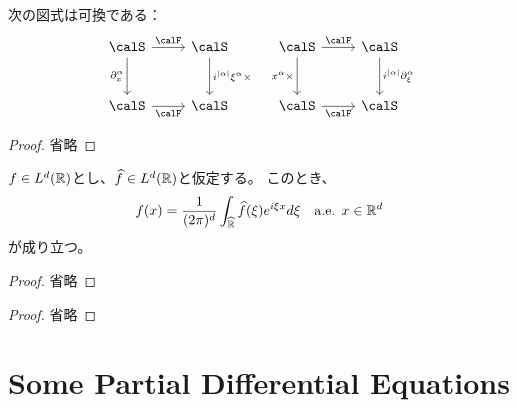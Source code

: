 \documentclass[report]{jlreq}
\begin{document}
\begin{proposition}
    次の図式は可換である：
    \begin{equation}
        \begin{tikzcd}[row sep=large]
            \calS \ar{r}{\calF} \ar{d}[swap]{\partial_x^\alpha} 
                & \calS \ar{d}{i^{|\alpha|}\xi^\alpha \times} \\
            \calS \ar{r}[swap]{\calF}
                & \calS
        \end{tikzcd}
        \quad
        \begin{tikzcd}[row sep=large]
            \calS \ar{r}{\calF} \ar{d}[swap]{x^\alpha \times} 
                & \calS \ar{d}{i^{|\alpha|}\partial_\xi^\alpha} \\
            \calS \ar{r}[swap]{\calF}
                & \calS
        \end{tikzcd}
    \end{equation}
\end{proposition}

\begin{proof}
    省略
\end{proof}

\begin{theorem}[反転公式]
    $f \in L^d(\mathbb{R})$とし、$\widehat{f} \in L^d(\mathbb{R})$と仮定する。
    このとき、
    \begin{equation}
        f(x) = \frac{1}{(2\pi)^d} \int_{\widehat{\mathbb{R}}} \widehat{f}(\xi) e^{i\xi x} d\xi
            \quad \text{a.e. } x \in \mathbb{R}^d
    \end{equation}
    が成り立つ。
\end{theorem}

\begin{proof}
    省略
\end{proof}

\begin{theorem}
    \TODO{}
\end{theorem}

\begin{proof}
    省略
\end{proof}

%
\section{Some Partial Differential Equations}

%
\end{document}
